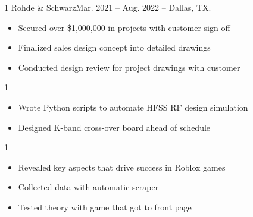 \documentclass[10pt, letterpaper, ragged2e, withhyper]{AltaCV/altacv}
\def\Rohde{1}
\def\LMCO{1}
\def\RUROBLOXDATA{0}	%
\begin{document}


\makecvheader


\begin{paracol}{2}



\if\Rohde1
 {Rohde \& Schwarz}{Mar. 2021 -- Aug. 2022 -- Dallas, TX.}{}
\begin{itemize}
\item Secured over \$1,000,000 in projects with customer sign-off
\item Finalized sales design concept into detailed drawings
\item Conducted design review for project drawings with customer
\end{itemize}
\divider
\fi

\if\LMCO1
 {}
\begin{itemize}
\item Wrote Python scripts to automate HFSS RF design simulation
\item Designed K-band cross-over board ahead of schedule
\end{itemize}
\fi


\if\RUROBLOXDATA1
\begin{itemize}
\item{Revealed key aspects that drive success in Roblox games}
\item{Collected data with automatic scraper}
\item{Tested theory with game that got to front page}
\end{itemize}
\fi


\end{paracol}
\end{document}
